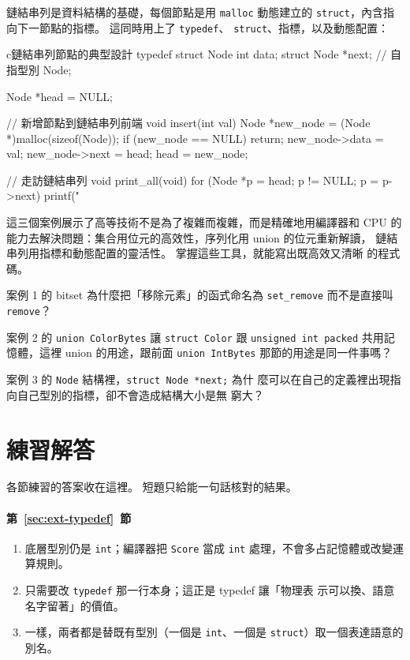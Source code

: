 鏈結串列是資料結構的基礎，每個節點是用 \texttt{malloc} 動態建立的
\texttt{struct}，內含指向下一節點的指標。 這同時用上了 \texttt{typedef}、
\texttt{struct}、指標，以及動態配置：

\begin{code}{c}{鏈結串列節點的典型設計}
typedef struct Node {
    int data;
    struct Node *next;  // 自指型別
} Node;

Node *head = NULL;

// 新增節點到鏈結串列前端
void insert(int val) {
    Node *new_node = (Node *)malloc(sizeof(Node));
    if (new_node == NULL) return;
    new_node->data = val;
    new_node->next = head;
    head = new_node;
}

// 走訪鏈結串列
void print_all(void) {
    for (Node *p = head; p != NULL; p = p->next) {
        printf("%
    }
}
\end{code}

這三個案例展示了高等技術不是為了複雜而複雜，而是精確地用編譯器和 CPU
的能力去解決問題：集合用位元的高效性，序列化用 union 的位元重新解讀，
鏈結串列用指標和動態配置的靈活性。 掌握這些工具，就能寫出既高效又清晰
的程式碼。

\begin{drills}[label=drills:ext-synthesis]
\item 案例 1 的 bitset 為什麼把「移除元素」的函式命名為
\texttt{set\_remove} 而不是直接叫 \texttt{remove}？
\item 案例 2 的 \texttt{union ColorBytes} 讓 \texttt{struct Color} 跟
\texttt{unsigned int packed} 共用記憶體，這裡 union 的用途，跟前面
\texttt{union IntBytes} 那節的用途是同一件事嗎？
\item 案例 3 的 \texttt{Node} 結構裡，\texttt{struct Node *next;} 為什
麼可以在自己的定義裡出現指向自己型別的指標，卻不會造成結構大小是無
窮大？
\end{drills}

\section*{練習解答}

各節練習的答案收在這裡。 短題只給能一句話核對的結果。

\paragraph{第~\ref{sec:ext-typedef}~節}
\begin{enumerate}
\item 底層型別仍是 \texttt{int}；編譯器把 \texttt{Score} 當成
\texttt{int} 處理，不會多占記憶體或改變運算規則。
\item 只需要改 \texttt{typedef} 那一行本身；這正是 typedef 讓「物理表
示可以換、語意名字留著」的價值。
\item 一樣，兩者都是替既有型別（一個是 \texttt{int}、一個是
\texttt{struct}）取一個表達語意的別名。
\end{enumerate}

